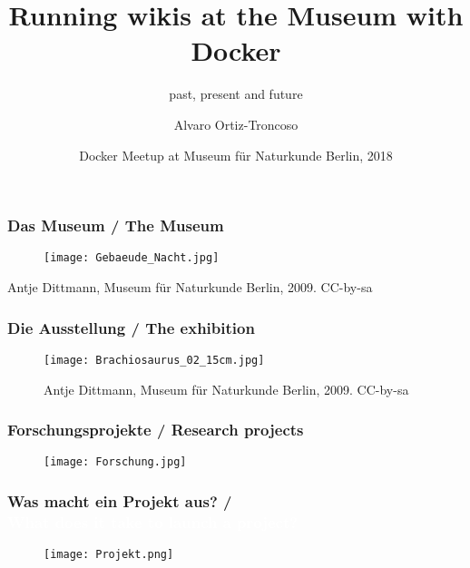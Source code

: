 \documentclass{beamer}
\title
{Running wikis at the Museum with Docker}
\subtitle{past, present and future}
\author
{Alvaro Ortiz-Troncoso\inst{1}}
\institute %
{
  \inst{1}%
  Museum für Naturkunde Berlin
}
\date
{Docker Meetup at Museum für Naturkunde Berlin, 2018}
\begin{document}
{
  \frame{\titlepage}
}

\begin{frame}
  \frametitle{Das Museum / \textcolor{mfn_green}{The Museum}}
  \begin{figure}
  \texttt{[image: Gebaeude\_Nacht.jpg]}
  \end{figure}
  \begin{center}{\tiny \textcopyright Antje Dittmann, Museum für Naturkunde Berlin, 2009. CC-by-sa}\end{center}
\end{frame}

\begin{frame}
  \frametitle{Die Ausstellung / \textcolor{mfn_green}{The exhibition}}
  \begin{figure}
  \texttt{[image: Brachiosaurus\_02\_15cm.jpg]}
  \begin{center}{\tiny \textcopyright Antje Dittmann, Museum für Naturkunde Berlin, 2009. CC-by-sa}\end{center}
  \end{figure}
\end{frame}

\begin{frame}
  \frametitle{Forschungsprojekte / \textcolor{mfn_green}{Research projects}}
  \begin{figure}
  \texttt{[image: Forschung.jpg]}
  \end{figure}
\end{frame}

{
\begin{frame}
  \frametitle{Was macht ein Projekt aus? /\\ \textcolor{white}{What does it take to launch a project?}}
  \begin{figure}
  \texttt{[image: Projekt.png]}
  \end{figure}
\end{frame}
}
\end{document}
